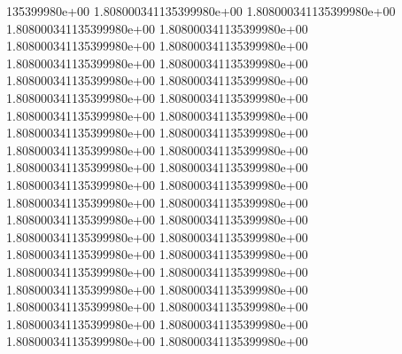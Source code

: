 135399980e+00	1.808000341135399980e+00	1.808000341135399980e+00	1.808000341135399980e+00	1.808000341135399980e+00	1.808000341135399980e+00	1.808000341135399980e+00	1.808000341135399980e+00	1.808000341135399980e+00	1.808000341135399980e+00	1.808000341135399980e+00	1.808000341135399980e+00	1.808000341135399980e+00	1.808000341135399980e+00	1.808000341135399980e+00	1.808000341135399980e+00	1.808000341135399980e+00	1.808000341135399980e+00	1.808000341135399980e+00	1.808000341135399980e+00	1.808000341135399980e+00	1.808000341135399980e+00	1.808000341135399980e+00	1.808000341135399980e+00	1.808000341135399980e+00	1.808000341135399980e+00	1.808000341135399980e+00	1.808000341135399980e+00	1.808000341135399980e+00	1.808000341135399980e+00	1.808000341135399980e+00	1.808000341135399980e+00	1.808000341135399980e+00	1.808000341135399980e+00	1.808000341135399980e+00	1.808000341135399980e+00	1.808000341135399980e+00	1.808000341135399980e+00	1.808000341135399980e+00	1.808000341135399980e+00	1.808000341135399980e+00

